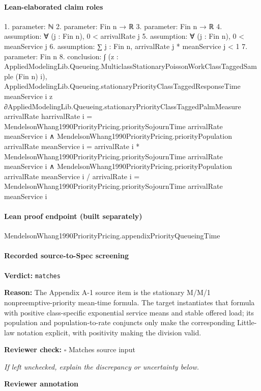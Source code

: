 \documentclass[10pt]{article}
\newcommand{\reviewerbox}{%
  \par\noindent\fbox{\parbox{0.96\linewidth}{\rule{0pt}{0.38in}}}\par
}
\newcommand{\reviewmatch}[1]{%
  \par\noindent\textbf{Reviewer check:} $\square$\; #1\par
  \noindent\emph{If left unchecked, explain the discrepancy or uncertainty below.}\par
}
\begin{document}
\paragraph{Lean-elaborated claim roles}\begin{ReviewVerbatim}
1. parameter: ℕ
2. parameter: Fin n → ℝ
3. parameter: Fin n → ℝ
4. assumption: ∀ (j : Fin n), 0 < arrivalRate j
5. assumption: ∀ (j : Fin n), 0 < meanService j
6. assumption: ∑ j : Fin n, arrivalRate j * meanService j < 1
7. parameter: Fin n
8. conclusion: ∫ (z : AppliedModelingLib.Queueing.MulticlassStationaryPoissonWorkClassTaggedSample (Fin n) i),
      AppliedModelingLib.Queueing.stationaryPriorityClassTaggedResponseTime meanService i
        z ∂AppliedModelingLib.Queueing.stationaryPriorityClassTaggedPalmMeasure arrivalRate harrivalRate i =
    MendelsonWhang1990PriorityPricing.prioritySojournTime arrivalRate meanService i ∧
  MendelsonWhang1990PriorityPricing.priorityPopulation arrivalRate meanService i =
      arrivalRate i * MendelsonWhang1990PriorityPricing.prioritySojournTime arrivalRate meanService i ∧
    MendelsonWhang1990PriorityPricing.priorityPopulation arrivalRate meanService i / arrivalRate i =
      MendelsonWhang1990PriorityPricing.prioritySojournTime arrivalRate meanService i
\end{ReviewVerbatim}

\paragraph{Lean proof endpoint (built separately)}\begin{ReviewVerbatim}
MendelsonWhang1990PriorityPricing.appendixPriorityQueueingTime
\end{ReviewVerbatim}

\paragraph{Recorded source-to-Spec screening}
\textbf{Verdict:} \texttt{matches}
\\
{\raggedright
\textbf{Reason:} The Appendix A-\allowbreak{}1 source item is the stationary M/\allowbreak{}M/\allowbreak{}1 nonpreemptive-\allowbreak{}priority mean-\allowbreak{}time formula.\allowbreak{}  The target instantiates that formula with positive class-\allowbreak{}specific exponential service means and stable offered load;\allowbreak{} its population and population-\allowbreak{}to-\allowbreak{}rate conjuncts only make the corresponding Little-\allowbreak{}law notation explicit, with positivity making the division valid.\allowbreak{}
\par}
\reviewmatch{Matches source input}
\noindent\textbf{Reviewer annotation}\par
\reviewerbox
\clearpage
\hypertarget{source-claim-35dff0bacecfebeb}{}
\end{document}

